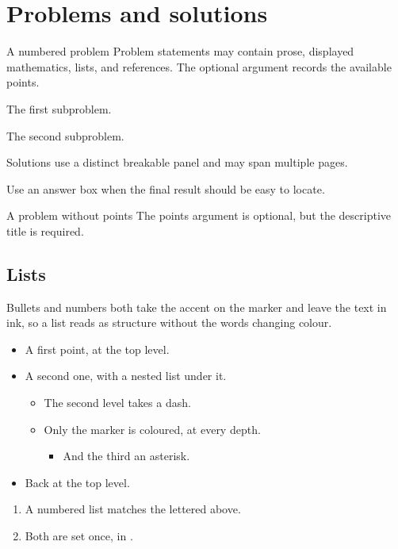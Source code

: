 \section{Problems and solutions}

\begin{problem}[12 points]{A numbered problem}
  Problem statements may contain prose, displayed mathematics, lists, and references.
  The optional argument records the available points.
  \begin{subproblems}
    \item The first subproblem.
    \item The second subproblem.
  \end{subproblems}

  \begin{solution}
    Solutions use a distinct breakable panel and may span multiple pages.
  \end{solution}

  \begin{answer}
    Use an answer box when the final result should be easy to locate.
  \end{answer}
\end{problem}

\begin{problem}{A problem without points}
  The points argument is optional, but the descriptive title is required.
\end{problem}

\subsection*{Lists}

Bullets and numbers both take the accent on the marker and leave the text in ink, so a list reads as structure without the words changing colour.

\begin{itemize}
  \item A first point, at the top level.
  \item A second one, with a nested list under it.
  \begin{itemize}
    \item The second level takes a dash.
    \item Only the marker is coloured, at every depth.
    \begin{itemize}
      \item And the third an asterisk.
    \end{itemize}
  \end{itemize}
  \item Back at the top level.
\end{itemize}

\begin{enumerate}
  \item A numbered list matches the lettered  above.
  \item Both are set once, in .
\end{enumerate}
